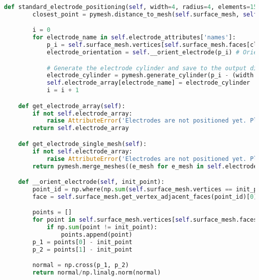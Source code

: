 \begin{lstlisting}[language=Python,caption={Class handling electrode operations on the models},captionpos=b,label=lst:electrode_operations_class]
    def standard_electrode_positioning(self, width=4, radius=4, elements=150):
        closest_point = pymesh.distance_to_mesh(self.surface_mesh, self.electrode_attributes['coordinates'])[1] # Get the closest point to the one provided

        i = 0
        for electrode_name in self.electrode_attributes['names']:
            p_i = self.surface_mesh.vertices[self.surface_mesh.faces[closest_point[i]]][0] # Get the surface vertex coordinates
            electrode_orientation = self.__orient_electrode(p_i) # Orient the electrode perpendicular to the surface

            # Generate the electrode cylinder and save to the output dictionary
            electrode_cylinder = pymesh.generate_cylinder(p_i - (width * electrode_orientation)/4., p_i + (width * electrode_orientation)/4., radius, radius, elements)
            self.electrode_array[electrode_name] = electrode_cylinder
            i = i + 1

    def get_electrode_array(self):
        if not self.electrode_array:
            raise AttributeError('Electrodes are not positioned yet. Please call the positioning function.')
        return self.electrode_array

    def get_electrode_single_mesh(self):
        if not self.electrode_array:
            raise AttributeError('Electrodes are not positioned yet. Please call the positioning function.')
        return pymesh.merge_meshes((e_mesh for e_mesh in self.electrode_array.values()))

    def __orient_electrode(self, init_point):
        point_id = np.where(np.sum(self.surface_mesh.vertices == init_point, axis=1))[0][0] # Unique point assumed
        face = self.surface_mesh.get_vertex_adjacent_faces(point_id)[0]

        points = []
        for point in self.surface_mesh.vertices[self.surface_mesh.faces[face]]:
            if np.sum(point != init_point):
                points.append(point)
        p_1 = points[0] - init_point
        p_2 = points[1] - init_point

        normal = np.cross(p_1, p_2)
        return normal/np.linalg.norm(normal)


\end{lstlisting}

